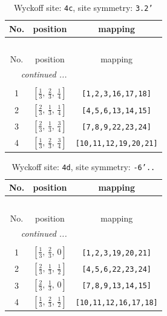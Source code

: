 \documentclass[fleqn,8pt]{jsarticle}
\begin{document}
\renewcommand{\arraystretch}{1.2}
\begin{longtable}{ccc}
\caption{Wyckoff site: {\tt 4c}, site symmetry: {\tt 3.2'}}
 \\
 \hline \hline
No. & position & mapping \\ \hline \endfirsthead

\multicolumn{2}{l}{\tablename\ \thetable{}} \\
 \hline \hline
No. & position & mapping \\ \hline \endhead

 \hline \hline
\multicolumn{2}{r}{\footnotesize\it continued ...} \\ \endfoot

 \hline \hline
\multicolumn{2}{r}{} \\ \endlastfoot

1 & $\left[ \frac{1}{3},\, \frac{2}{3},\, \frac{1}{4} \right]$ & {\tt [1,2,3,16,17,18]} \\ \hline
2 & $\left[ \frac{2}{3},\, \frac{1}{3},\, \frac{1}{4} \right]$ & {\tt [4,5,6,13,14,15]} \\ \hline
3 & $\left[ \frac{2}{3},\, \frac{1}{3},\, \frac{3}{4} \right]$ & {\tt [7,8,9,22,23,24]} \\ \hline
4 & $\left[ \frac{1}{3},\, \frac{2}{3},\, \frac{3}{4} \right]$ & {\tt [10,11,12,19,20,21]} \\
\end{longtable}
\renewcommand{\arraystretch}{1.2}
\begin{longtable}{ccc}
\caption{Wyckoff site: {\tt 4d}, site symmetry: {\tt -6'..}}
 \\
 \hline \hline
No. & position & mapping \\ \hline \endfirsthead

\multicolumn{2}{l}{\tablename\ \thetable{}} \\
 \hline \hline
No. & position & mapping \\ \hline \endhead

 \hline \hline
\multicolumn{2}{r}{\footnotesize\it continued ...} \\ \endfoot

 \hline \hline
\multicolumn{2}{r}{} \\ \endlastfoot

1 & $\left[ \frac{1}{3},\, \frac{2}{3},\, 0 \right]$ & {\tt [1,2,3,19,20,21]} \\ \hline
2 & $\left[ \frac{2}{3},\, \frac{1}{3},\, \frac{1}{2} \right]$ & {\tt [4,5,6,22,23,24]} \\ \hline
3 & $\left[ \frac{2}{3},\, \frac{1}{3},\, 0 \right]$ & {\tt [7,8,9,13,14,15]} \\ \hline
4 & $\left[ \frac{1}{3},\, \frac{2}{3},\, \frac{1}{2} \right]$ & {\tt [10,11,12,16,17,18]} \\
\end{longtable}
\end{document}
